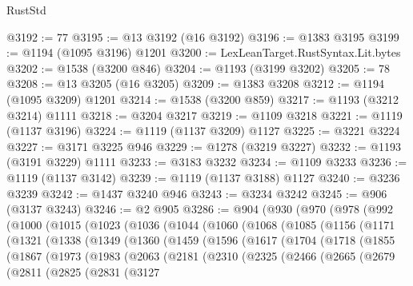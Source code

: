 \begin{lexlean}{RustStd}
\begin{coremodule}
@3192 := 77
@3195 := @13 @3192 (@16 @3192)
@3196 := @1383 @3195
@3199 := @1194 (@1095 @3196) @1201
@3200 := LexLeanTarget.RustSyntax.Lit.bytes
@3202 := @1538 (@3200 @846)
@3204 := @1193 (@3199 @3202)
@3205 := 78
@3208 := @13 @3205 (@16 @3205)
@3209 := @1383 @3208
@3212 := @1194 (@1095 @3209) @1201
@3214 := @1538 (@3200 @859)
@3217 := @1193 (@3212 @3214) @1111
@3218 := @3204 @3217
@3219 := @1109 @3218
@3221 := @1119 (@1137 @3196)
@3224 := @1119 (@1137 @3209) @1127
@3225 := @3221 @3224
@3227 := @3171 @3225 @946
@3229 := @1278 (@3219 @3227)
@3232 := @1193 (@3191 @3229) @1111
@3233 := @3183 @3232
@3234 := @1109 @3233
@3236 := @1119 (@1137 @3142)
@3239 := @1119 (@1137 @3188) @1127
@3240 := @3236 @3239
@3242 := @1437 @3240 @946
@3243 := @3234 @3242
@3245 := @906 (@3137 @3243)
@3246 := @2 @905
@3286 := @904
    (@930
      (@970
        (@978
          (@992
            (@1000
              (@1015
                (@1023
                  (@1036
                    (@1044
                      (@1060
                        (@1068
                          (@1085
                            (@1156
                              (@1171
                                (@1321
                                  (@1338
                                    (@1349
                                      (@1360
                                        (@1459
                                          (@1596
                                            (@1617
                                              (@1704
                                                (@1718
                                                  (@1855
                                                    (@1867
                                                      (@1973
                                                        (@1983
                                                          (@2063
                                                            (@2181
                                                              (@2310
                                                                (@2325
                                                                  (@2466
                                                                    (@2665
                                                                      (@2679
                                                                        (@2811
                                                                          (@2825
                                                                            (@2831
                                                                              (@3127

\end{coremodule}
\end{lexlean}
